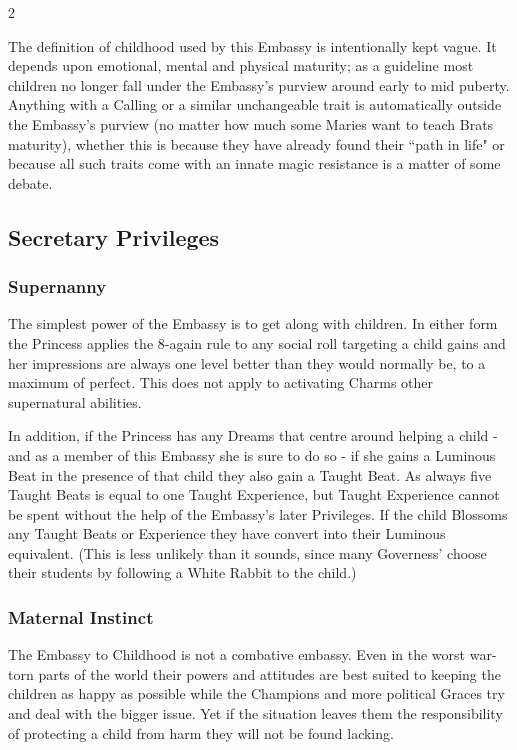 \begin{multicols}{2}
\begin{mybox}
The definition of childhood used by this Embassy is intentionally kept vague. It depends upon emotional, mental and physical maturity; as a guideline most children no longer fall under the Embassy's purview around early to mid puberty. Anything with a Calling or a similar unchangeable trait is automatically outside the Embassy's purview (no matter how much some Maries want to teach Brats maturity), whether this is because they have already found their \textquotedblleft path in life" or because all such traits come with an innate magic resistance is a matter of some debate.

\end{mybox}

\subsection*{Secretary Privileges}

\subsubsection*{Supernanny}

The simplest power of the Embassy is to get along with children. In either form the Princess applies the 8-again rule to any social roll targeting a child gains and her impressions are always one level better than they would normally be, to a maximum of perfect. This does not apply to activating Charms other supernatural abilities.

In addition, if the Princess has any Dreams that centre around helping a child - and as a member of this Embassy she is sure to do so - if she gains a Luminous Beat in the presence of that child they also gain a Taught Beat. As always five Taught Beats is equal to one Taught Experience, but Taught Experience cannot be spent without the help of the Embassy's later Privileges. If the child Blossoms any Taught Beats or Experience they have convert into their Luminous equivalent. (This is less unlikely than it sounds, since many Governess' choose their students by following a White Rabbit to the child.)

\subsubsection*{Maternal Instinct}

The Embassy to Childhood is not a combative embassy. Even in the worst war-torn parts of the world their powers and attitudes are best suited to keeping the children as happy as possible while the Champions and more political Graces try and deal with the bigger issue. Yet if the situation leaves them the responsibility of protecting a child from harm they will not be found lacking.


\end{multicols}
